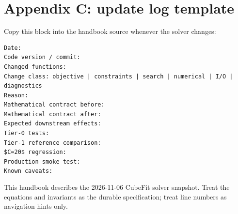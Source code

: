\documentclass[10pt,a4paper]{article}
\begin{document}
\section{Appendix C: update log template}
Copy this block into the handbook source whenever the solver changes:
\begin{lstlisting}
Date:
Code version / commit:
Changed functions:
Change class: objective | constraints | search | numerical | I/O | diagnostics
Reason:
Mathematical contract before:
Mathematical contract after:
Expected downstream effects:
Tier-0 tests:
Tier-1 reference comparison:
$C=20$ regression:
Production smoke test:
Known caveats:
\end{lstlisting}

\vfill
\begin{center}\small\color{darkgray}
This handbook describes the 2026-11-06 CubeFit solver snapshot. Treat the equations and invariants as the durable specification; treat line numbers as navigation hints only.
\end{center}
\end{document}
